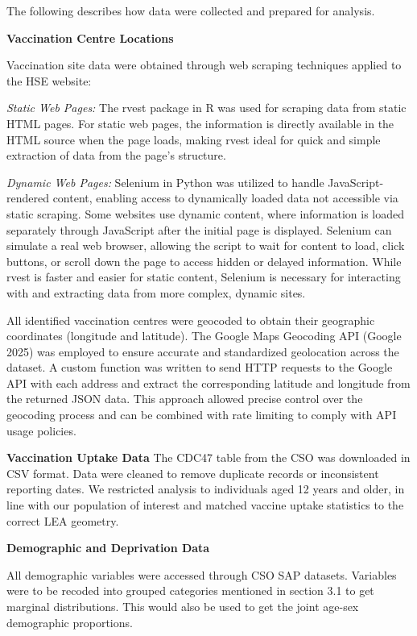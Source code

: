 \documentclass{article}
\begin{document}
The following describes how data were collected and prepared for
analysis.

\textbf{Vaccination Centre Locations}

Vaccination site data were obtained through web scraping techniques
applied to the HSE website:

\emph{Static Web Pages:} The rvest package in R was used for scraping
data from static HTML pages. For static web pages, the information is
directly available in the HTML source when the page loads, making rvest
ideal for quick and simple extraction of data from the page's structure.

\emph{Dynamic Web Pages:} Selenium in Python was utilized to handle
JavaScript-rendered content, enabling access to dynamically loaded data
not accessible via static scraping. Some websites use dynamic content,
where information is loaded separately through JavaScript after the
initial page is displayed. Selenium can simulate a real web browser,
allowing the script to wait for content to load, click buttons, or
scroll down the page to access hidden or delayed information. While
rvest is faster and easier for static content, Selenium is necessary for
interacting with and extracting data from more complex, dynamic sites.

All identified vaccination centres were geocoded to obtain their
geographic coordinates (longitude and latitude). The Google Maps
Geocoding API (Google 2025) was employed to ensure accurate and
standardized geolocation across the dataset. A custom function was
written to send HTTP requests to the Google API with each address and
extract the corresponding latitude and longitude from the returned JSON
data. This approach allowed precise control over the geocoding process
and can be combined with rate limiting to comply with API usage
policies.

\textbf{Vaccination Uptake Data} The CDC47 table from the CSO was
downloaded in CSV format. Data were cleaned to remove duplicate records
or inconsistent reporting dates. We restricted analysis to individuals
aged 12 years and older, in line with our population of interest and
matched vaccine uptake statistics to the correct LEA geometry.

\textbf{Demographic and Deprivation Data}

All demographic variables were accessed through CSO SAP datasets.
Variables were to be recoded into grouped categories mentioned in
section 3.1 to get marginal distributions. This would also be used to
get the joint age-sex demographic proportions.
\end{document}
